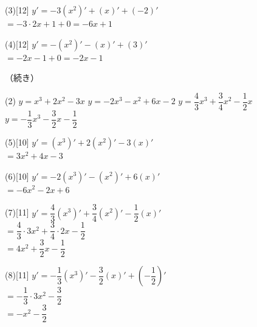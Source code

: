 \documentclass[14pt,dvipdfmx]{jsarticle}
\begin{document}
\noindent
\begin{minipage}[t]{0.49\linewidth}
\begin{answerbox}{(3)}[12]
  $y'=-3(x^{2})'+(x)'+(-2)'$\\[0.25em]
  $=-3\cdot 2x+1+0=-6x+1$
\end{answerbox}
\end{minipage}\hfill
\begin{minipage}[t]{0.49\linewidth}
\begin{answerbox}{(4)}[12]
  $y'=-(x^{2})'-(x)'+(3)'$\\[0.25em]
  $=-2x-1+0=-2x-1$
\end{answerbox}
\end{minipage}

\vfill
\nextpage

\vspace{-1.4zw}%
\quad（続き）
\begin{tasks}[label=(\arabic*), label-width=1.6zw, item-indent=2zw, after-item-skip=0.08em, start=5](2)
  \task $y=x^{3}+2x^{2}-3x$
  \task $y=-2x^{3}-x^{2}+6x-2$
  \task $y=\dfrac{4}{3}x^{3}+\dfrac{3}{4}x^{2}-\dfrac{1}{2}x$
  \task $y=-\dfrac{1}{3}x^{3}-\dfrac{3}{2}x-\dfrac{1}{2}$
\end{tasks}
\vspace{0.2em}
\noindent
\begin{minipage}[t]{0.49\linewidth}
\begin{answerbox}{(5)}[10]
  $y'=(x^{3})'+2(x^{2})'-3(x)'$\\[0.3em]
  $=3x^{2}+4x-3$
\end{answerbox}
\end{minipage}\hfill
\begin{minipage}[t]{0.49\linewidth}
\begin{answerbox}{(6)}[10]
  $y'=-2(x^{3})'-(x^{2})'+6(x)'$\\[0.3em]
  $=-6x^{2}-2x+6$
\end{answerbox}
\end{minipage}

\vspace{0.35em}
\begin{answerbox}{(7)}[11]
  $y'=\dfrac{4}{3}(x^{3})'+\dfrac{3}{4}(x^{2})'-\dfrac{1}{2}(x)'$\\[0.35em]
  $=\dfrac{4}{3}\cdot 3x^{2}+\dfrac{3}{4}\cdot 2x-\dfrac{1}{2}$\\[0.3em]
  $=4x^{2}+\dfrac{3}{2}x-\dfrac{1}{2}$
\end{answerbox}
\vspace{0.15em}
\begin{answerbox}{(8)}[11]
  $y'=-\dfrac{1}{3}(x^{3})'-\dfrac{3}{2}(x)'+\left(-\dfrac{1}{2}\right)'$\\[0.35em]
  $=-\dfrac{1}{3}\cdot 3x^{2}-\dfrac{3}{2}$\\[0.3em]
  $=-x^{2}-\dfrac{3}{2}$
\end{answerbox}
\end{document}
